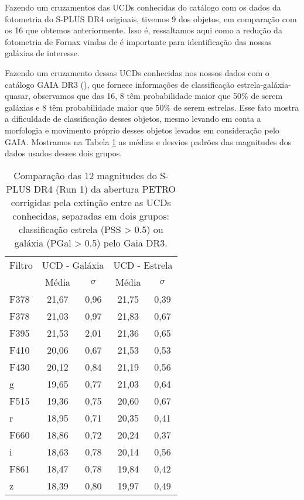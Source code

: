 Fazendo um cruzamentos das UCDs conhecidas do catálogo \cite{catalog_ucds} com os dados da fotometria do S-PLUS DR4 originais, tivemos 9 dos objetos, em comparação com os 16 que obtemos anteriormente. Isso é, ressaltamos aqui como a redução da fotometria de Fornax vindas de \cite{haack2024splusfornaxprojectsfp} é importante para identificação das nossas galáxias de interesse.

\vspace{\baselineskip}

Fazendo um cruzamento dessas UCDs conhecidas nos nossos dados com o catálogo GAIA DR3 (\cite{GAIA_DR3}), que fornece informações de classificação estrela-galáxia-quasar, observamos que das 16, 8 têm probabilidade maior que 50\% de serem galáxias e 8 têm probabilidade maior que 50\% de serem estrelas. Esse fato mostra a dificuldade de classificação desses objetos, mesmo levando em conta a morfologia e movimento próprio desses objetos levados em consideração pelo GAIA. Mostramos na Tabela \ref{tab_ucds_stars_galaxy_like} as médias e desvios padrões das magnitudes dos dados usados desses dois grupos.

\begin{table}[!ht]
    \centering
    \caption{Comparação das 12 magnitudes do S-PLUS DR4 (Run 1) da abertura PETRO corrigidas pela extinção entre as UCDs conhecidas, separadas em dois grupos: classificação estrela (PSS > 0.5) ou galáxia (PGal > 0.5) pelo Gaia DR3.}   \begin{tabular}{lcccc}
        \toprule
        Filtro & \multicolumn{2}{c}{UCD - Galáxia} & \multicolumn{2}{c}{UCD - Estrela} \\
        & Média & $\sigma$ & Média & $\sigma$ \\
        \midrule
        F378 & 21,67 & 0,96 & 21,75 & 0,39 \\
        F378 & 21,03 & 0,97 & 21,83 & 0,67 \\
        F395 & 21,53 & 2,01 & 21,36 & 0,65 \\
        F410 & 20,06 & 0,67 & 21,53 & 0,53 \\
        F430 & 20,12 & 0,84 & 21,19 & 0,56 \\
        g    & 19,65 & 0,77 & 21,03 & 0,64 \\
        F515 & 19,36 & 0,75 & 20,60 & 0,67 \\
        r    & 18,95 & 0,71 & 20,35 & 0,41 \\
        F660 & 18,86 & 0,72 & 20,24 & 0,37 \\
        i    & 18,63 & 0,78 & 20,14 & 0,56 \\
        F861 & 18,47 & 0,78 & 19,84 & 0,42 \\
        z    & 18,39 & 0,80 & 19,97 & 0,49 \\
        \bottomrule
    \end{tabular}
    \label{tab_ucds_stars_galaxy_like}
\end{table}

